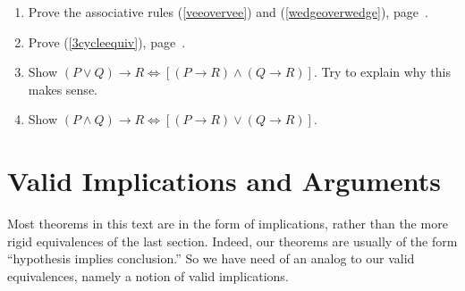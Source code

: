 \begin{multicols}{2}
\begin{enumerate}
\begin{multicols}{2}
  \begin{enumerate}[(a)]
  \item $\T\longrightarrow P$
  \item $\F\longrightarrow P$
  \item $P\longrightarrow \T$
  \item $P\longrightarrow \F$
  \item $P\longleftrightarrow\T$
  \item $P\longleftrightarrow\F$
  \item $P\longleftrightarrow(\sim P)$
  \item $P\longrightarrow(\sim P)$
  \end{enumerate}\end{multicols}
\item Prove the associative rules (\ref{veeovervee}) and
      (\ref{wedgeoverwedge}), page~\pageref{veeovervee}.
\item Prove (\ref{3cycleequiv}), page~\pageref{3cycleequiv}.
\item Show $(P\vee Q)\rightarrow R
   \iff [(P\rightarrow R)\wedge(Q\rightarrow R)].$
   Try to explain why this makes sense.
\item Show $(P\wedge Q)\rightarrow R
   \iff [(P\rightarrow R)\vee(Q\rightarrow R)].$
\end{enumerate}
\end{multicols}

\newpage
\section{Valid Implications and Arguments\label{ValidImplicationsSection}}

Most theorems in this text are in the form of implications,
rather than the more rigid equivalences of the last section.
Indeed, our theorems are usually of the form
``hypothesis implies conclusion.''  So we have need
of an analog to our valid equivalences, namely 
a notion of valid implications.
